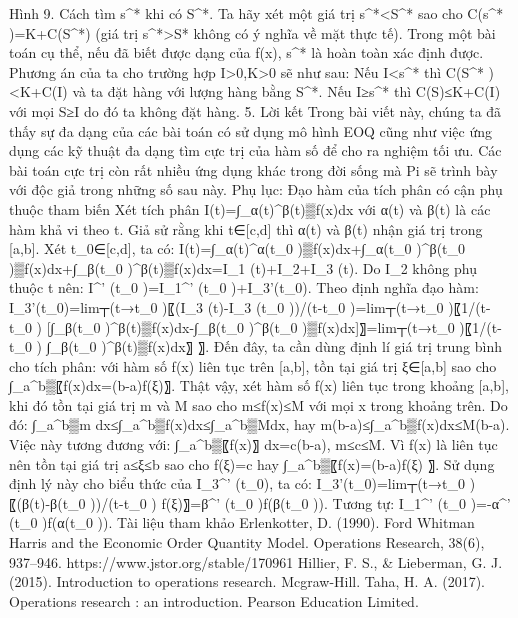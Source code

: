 \begin{multicols}{2}
	Hình 9. Cách tìm s^* khi có S^*.
	Ta hãy xét một giá trị s^*<S^* sao cho C(s^* )=K+C(S^*) (giá trị s^*>S* không có ý nghĩa về mặt thực tế). Trong một bài toán cụ thể, nếu đã biết được dạng của f(x), s^* là hoàn toàn xác định được. 
	Phương án của ta cho trường hợp I>0,K>0 sẽ như sau:
	Nếu I<s^* thì C(S^* )<K+C(I) và ta đặt hàng với lượng hàng bằng S^*.
	Nếu I≥s^* thì C(S)≤K+C(I) với mọi S≥I do đó ta không đặt hàng.
	5. Lời kết
	Trong bài viết này, chúng ta đã thấy sự đa dạng của các bài toán có sử dụng mô hình EOQ cũng như việc ứng dụng các kỹ thuật đa dạng tìm cực trị của hàm số để cho ra nghiệm tối ưu. Các bài toán cực trị còn rất nhiều ứng dụng khác trong đời sống mà Pi sẽ trình bày với độc giả trong những số sau này.
	Phụ lục: Đạo hàm của tích phân có cận phụ thuộc tham biến
	Xét tích phân I(t)=∫_α(t)^β(t)▒f(x)dx với α(t) và β(t) là các hàm khả vi theo t. Giả sử rằng khi t∈[c,d] thì α(t) và β(t) nhận giá trị trong [a,b].
	Xét t_0∈[c,d], ta có:
	I(t)=∫_α(t)^α(t_0 )▒f(x)dx+∫_α(t_0 )^β(t_0 )▒f(x)dx+∫_β(t_0 )^β(t)▒f(x)dx=I_1 (t)+I_2+I_3 (t).
	Do I_2 không phụ thuộc t nên:
	I^' (t_0 )=I_1^' (t_0 )+I_3'(t_0).
	Theo định nghĩa đạo hàm:
	I_3'(t_0)=lim┬(t→t_0 )⁡〖(I_3 (t)-I_3 (t_0 ))/(t-t_0 )=lim┬(t→t_0 )⁡〖1/(t-t_0 ) [∫_β(t_0 )^β(t)▒f(x)dx-∫_β(t_0 )^β(t_0 )▒f(x)dx]〗=lim┬(t→t_0 )⁡〖1/(t-t_0 ) ∫_β(t_0 )^β(t)▒f(x)dx〗 〗.
	Đến đây, ta cần dùng định lí giá trị trung bình cho tích phân: với hàm số f(x) liên tục trên [a,b], tồn tại giá trị ξ∈[a,b] sao cho ∫_a^b▒〖f(x)dx=(b-a)f(ξ)〗. Thật vậy, xét hàm số f(x) liên tục trong khoảng [a,b], khi đó tồn tại giá trị m và M sao cho m≤f(x)≤M với mọi x trong khoảng trên. Do đó:
	∫_a^b▒m dx≤∫_a^b▒f(x)dx≤∫_a^b▒Mdx,
	hay 
	m(b-a)≤∫_a^b▒f(x)dx≤M(b-a).
	Việc này tương đương với: ∫_a^b▒〖f(x)〗 dx=c(b-a), m≤c≤M. Vì f(x) là liên tục nên tồn tại giá trị a≤ξ≤b sao cho f(ξ)=c hay ∫_a^b▒〖f(x)=(b-a)f(ξ) 〗.
	Sử dụng định lý này cho biểu thức của I_3^' (t_0), ta có:
	I_3'(t_0)=lim┬(t→t_0 )⁡〖(β(t)-β(t_0 ))/(t-t_0 ) f(ξ)〗=β^' (t_0 )f(β(t_0 )).
	Tương tự:
	I_1^' (t_0 )=-α^' (t_0 )f(α(t_0 )).
	Tài liệu tham khảo
	Erlenkotter, D. (1990). Ford Whitman Harris and the Economic Order Quantity Model. Operations Research, 38(6), 937–946. https://www.jstor.org/stable/170961
	Hillier, F. S., & Lieberman, G. J. (2015). Introduction to operations research. Mcgraw-Hill.
	Taha, H. A. (2017). Operations research : an introduction. Pearson Education Limited.
\end{multicols}